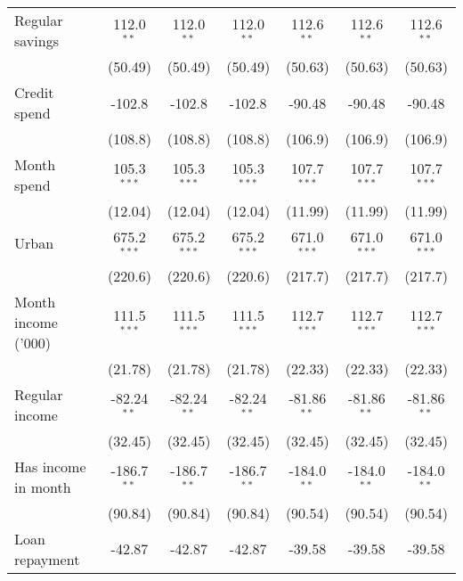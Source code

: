 \begin{table}[htbp]
\begin{footnotesize}
\begin{tabular}{lcccccc}
         Regular savings                  & 112.0$^{**}$  & 112.0$^{**}$  & 112.0$^{**}$  & 112.6$^{**}$  & 112.6$^{**}$  & 112.6$^{**}$\\
                                          & (50.49)       & (50.49)       & (50.49)       & (50.63)       & (50.63)       & (50.63)\\
         Credit spend                     & -102.8        & -102.8        & -102.8        & -90.48        & -90.48        & -90.48\\
                                          & (108.8)       & (108.8)       & (108.8)       & (106.9)       & (106.9)       & (106.9)\\
         Month spend                      & 105.3$^{***}$ & 105.3$^{***}$ & 105.3$^{***}$ & 107.7$^{***}$ & 107.7$^{***}$ & 107.7$^{***}$\\
                                          & (12.04)       & (12.04)       & (12.04)       & (11.99)       & (11.99)       & (11.99)\\
         Urban                            & 675.2$^{***}$ & 675.2$^{***}$ & 675.2$^{***}$ & 671.0$^{***}$ & 671.0$^{***}$ & 671.0$^{***}$\\
                                          & (220.6)       & (220.6)       & (220.6)       & (217.7)       & (217.7)       & (217.7)\\
         Month income ('000)              & 111.5$^{***}$ & 111.5$^{***}$ & 111.5$^{***}$ & 112.7$^{***}$ & 112.7$^{***}$ & 112.7$^{***}$\\
                                          & (21.78)       & (21.78)       & (21.78)       & (22.33)       & (22.33)       & (22.33)\\
         Regular income                   & -82.24$^{**}$ & -82.24$^{**}$ & -82.24$^{**}$ & -81.86$^{**}$ & -81.86$^{**}$ & -81.86$^{**}$\\
                                          & (32.45)       & (32.45)       & (32.45)       & (32.45)       & (32.45)       & (32.45)\\
         Has income in month              & -186.7$^{**}$ & -186.7$^{**}$ & -186.7$^{**}$ & -184.0$^{**}$ & -184.0$^{**}$ & -184.0$^{**}$\\
                                          & (90.84)       & (90.84)       & (90.84)       & (90.54)       & (90.54)       & (90.54)\\
         Loan repayment                   & -42.87        & -42.87        & -42.87        & -39.58        & -39.58        & -39.58\\

\end{tabular}
\end{footnotesize}
\end{table}
